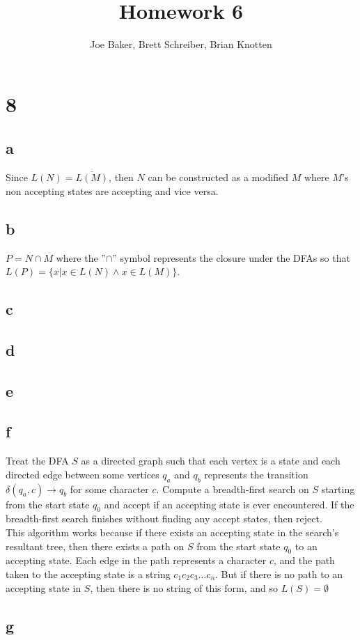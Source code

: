\documentclass[letterpaper,notitlepage,twoside]{article}
\begin{document}
\title{Homework 6}
\author{Joe Baker, Brett Schreiber, Brian Knotten}
\maketitle

\section*{8}

\subsection*{a}
Since $L(N) = \overline  {L(M)}$, then $N$ can be constructed as a modified $M$ where $M$'s non accepting states are accepting and vice versa.
\subsection*{b}
$P = N \cap M$ where the ''$\cap$'' symbol represents the closure under the DFAs so that $L(P) = \{x | x \in L(N) \land x \in L(M)\}$.
\subsection*{c}

\subsection*{d}

\subsection*{e}

\subsection*{f}
Treat the DFA $S$ as a directed graph such that each vertex is a state and each directed edge between some vertices $q_a$ and $q_b$ represents the transition $\delta(q_a, c) \rightarrow q_b$ for some character $c$. Compute a breadth-first search on $S$ starting from the start state $q_0$ and accept if an accepting state is ever encountered. If the breadth-first search finishes without finding any accept states, then reject. \\

This algorithm works because if there exists an accepting state in the search's resultant tree, then there exists a path on $S$ from the start state $q_0$ to an accepting state. Each edge in the path represents a character $c$, and the path taken to the accepting state is a string $c_1c_2c_3...c_n$. But if there is no path to an accepting state in $S$, then there is no string of this form, and so $L(S) = \emptyset$
\subsection*{g}
\end{document}

